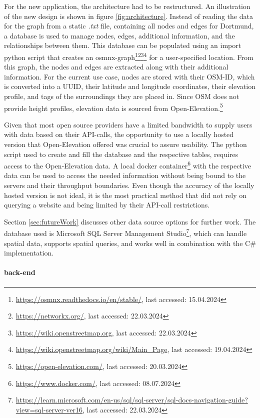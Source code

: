 For the new application, the architecture had to be restructured.
An illustration of the new design is shown in figure \ref{fig:architecture}.
Instead of reading the data for the graph from a static \textit{.txt} file, containing all nodes and edges for Dortmund, a database is used to manage nodes, edges, additional information, and the relationships between them. 
This database can be populated using an import python script that creates an osmnx-graph\footnote{\url{https://osmnx.readthedocs.io/en/stable/}, last accessed: 15.04.2024}\footnote{\url{https://networkx.org/}, last accessed: 22.03.2024}\footnote{\url{https://wiki.openstreetmap.org}, last accessed: 22.03.2024}\footnote{\url{https://wiki.openstreetmap.org/wiki/Main_Page}, last accessed: 19.04.2024} for a user-specified location. 
From this graph, the nodes and edges are extracted along with their additional information.
For the current use case, nodes are stored with their OSM-ID, which is converted into a UUID, their latitude and longitude coordinates, their elevation profile, and tags of the surroundings they are placed in.
Since OSM does not provide height profiles, elevation data is sourced from  Open-Elevation.\footnote{\url{https://open-elevation.com/}, last accessed: 20.03.2024} 

Given that most open source providers have a limited bandwidth to supply users with data based on their API-calls, the opportunity to use a locally hosted version that Open-Elevation offered was crucial to assure usability.
The python script used to create and fill the database and the respective tables, requires access to the Open-Elevation data.
A local docker container\footnote{\url{https://www.docker.com/}, last accessed: 08.07.2024} with the respective data can be used to access the needed information without being bound to the servers and their throughput boundaries. 
Even though the accuracy of the locally hosted version is not ideal, it is the most practical method that did not rely on querying a website and being limited by their API-call restrictions.


Section \ref{sec:futureWork} discusses other data source options for further work.
The database used is Microsoft SQL Server Management Studio\footnote{\url{https://learn.microsoft.com/en-us/sql/sql-server/sql-docs-navigation-guide?view=sql-server-ver16}, last accessed: 22.03.2024}, which can handle spatial data, supports spatial queries, and works well in combination with the C\# implementation.

\paragraph{back-end}

